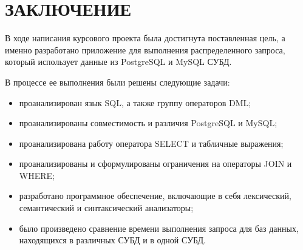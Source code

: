 \chapter*{ЗАКЛЮЧЕНИЕ}

В ходе написания курсового проекта была достигнута поставленная цель, а именно разработано приложение для выполнения распределенного запроса, который использует данные из PostgreSQL и MySQL СУБД.

В процессе ее выполнения были решены следующие задачи:

\begin{itemize}
	\item проанализирован язык SQL, а также группу операторов DML;
	\item проанализированы совместимость и различия PostgreSQL и MySQL;
	\item проанализирована работу оператора SELECT и табличные выражения;
	\item проанализированы и сформулированы ограничения на операторы JOIN и WHERE; 
	\item разработано программное обеспечение, включающие в себя лексический, семантический и синтаксический анализаторы;
	\item было произведено сравнение времени выполнения запроса для баз данных, находящихся в различных СУБД и в одной СУБД.
\end{itemize}